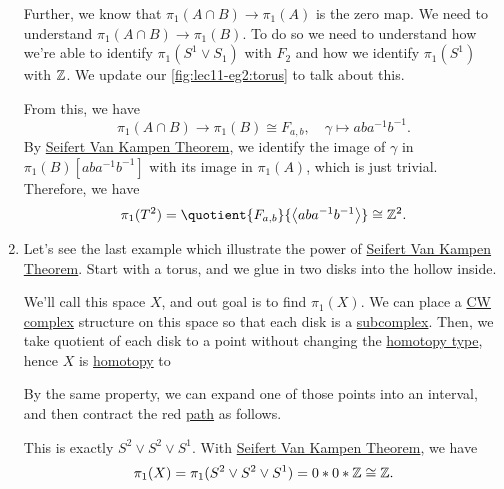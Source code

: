 \begin{eg}
\begin{enumerate}
		      Further, we know that \(\pi _1(A\cap B)\to \pi _1(A)\) is the zero map. We need to understand \(\pi_1(A\cap B)\to \pi _1(B)\). To do so we
		      need to understand how we're able to identify \(\pi _1(S^1\vee S_1)\) with \(F_2\) and how we identify \(\pi _1(S^1)\) with \(\mathbb{\MakeUppercase{z}} \).
		      We update our \autoref{fig:lec11-eg2:torus} to talk about this.
		      \begin{figure}[H]
			      \centering
			      \label{fig:lec11-eg2:torus-ver2}
		      \end{figure}
		      From this, we have
		      \[
			      \pi _1(A\cap B) \to \pi _1(B)\cong F_{a, b},\quad \gamma \mapsto aba^{-1} b^{-1}.
		      \]
		      By \hyperref[thm:Seifert-Van-Kampen-Theorem]{Seifert Van Kampen Theorem}, we identify the image of \(\gamma \) in \(\pi _1(B)[aba^{-1} b^{-1} ]\) with
		      its image in \(\pi _1(A)\), which is just trivial. Therefore, we have
		      \[
			      \pi _1(T^2) = \quotient{F_{a, b}}{\left< aba^{-1} b^{-1}  \right> } \cong \mathbb{\MakeUppercase{z}} ^2.
		      \]
		\item Let's see the last example which illustrate the power of \hyperref[thm:Seifert-Van-Kampen-Theorem]{Seifert Van Kampen Theorem}. Start with a torus, and
		      we glue in two disks into the hollow inside.
		      \begin{figure}[H]
			      \centering
			      \label{fig:lec11:eg-3:1}
		      \end{figure}
		      We'll call this space \(X\), and out goal is to find \(\pi_1(X)\). We can place a \hyperref[def:CW-Complex]{CW complex} structure on this
		      space so that each disk is a \hyperref[def:CW-subcomplex]{subcomplex}. Then, we take quotient of each disk to a point without changing the \hyperref[def:homotopy-type]{homotopy type},
		      hence \(X\) is \hyperref[def:homotopy]{homotopy} to
		      \begin{figure}[H]
			      \centering
			      \label{fig:lec11:eg-3:2}
		      \end{figure}
		      By the same property, we can expand one of those points into an interval, and then contract the red \hyperref[def:path]{path} as follows.
		      \begin{figure}[H]
			      \centering
			      \label{fig:lec11:eg-3:3}
		      \end{figure}
		      This is exactly \(S^{2} \vee S^{2} \vee S^1\). With \hyperref[thm:Seifert-Van-Kampen-Theorem]{Seifert Van Kampen Theorem}, we have
		      \[
			      \pi _1(X) = \pi _1(S^{2} \vee S^{2} \vee S^1) = 0\ast 0\ast \mathbb{\MakeUppercase{z}} \cong \mathbb{\MakeUppercase{z}}.
		      \]
	\end{enumerate}
\end{eg}

